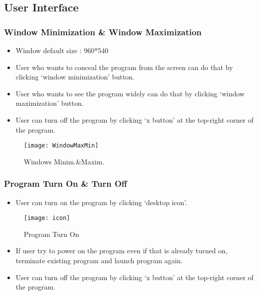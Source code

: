 \documentclass[conference,compsoc, twocolumn]{IEEEtran}
\begin{document}
\subsection{User Interface}


\subsubsection{Window Minimization & Window Maximization}
\begin{itemize}
\item Window default size : 960*540
\item User who wants to conceal the program from the screen can do that by clicking ‘window minimization’ button.
\item User who wants to see the program widely can do that by clicking ‘window maximization’ button.
\item User can turn off the program by clicking ‘x button’ at the top-right corner of  the program.
\end{itemize}

\begin{figure}[H]
\centering\texttt{[image: WindowMaxMin]}
\caption{Windows Minim.\&Maxim.}
\end{figure}

\subsubsection{Program Turn On \& Turn Off}
\begin{itemize}
\item User can turn on the program by clicking ‘desktop icon’.
\end{itemize}

\begin{figure}[H]
\centering\texttt{[image: icon]}
\caption{Program Turn On}
\end{figure}

\begin{itemize}
\item If user try to power on the program even if that is already turned on, terminate existing program and launch program again.
\end{itemize}

\begin{itemize}
\item User can turn off the program by clicking ‘x button’ at the top-right corner of  the program.
\end{itemize}
\end{document}
